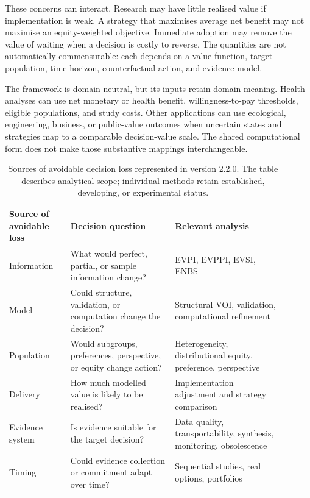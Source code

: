 These concerns can interact. Research may have little realised value if
implementation is weak. A strategy that maximises average net benefit may not
maximise an equity-weighted objective. Immediate adoption may remove the value
of waiting when a decision is costly to reverse. The quantities are not
automatically commensurable: each depends on a value function, target
population, time horizon, counterfactual action, and evidence model.

The framework is domain-neutral, but its inputs retain domain meaning. Health
analyses can use net monetary or health benefit, willingness-to-pay thresholds,
eligible populations, and study costs. Other applications can use ecological,
engineering, business, or public-value outcomes when uncertain states and
strategies map to a comparable decision-value scale. The shared computational
form does not make those substantive mappings interchangeable.

\begin{table}[!ht]
\centering
\footnotesize
\begin{tabular}{p{0.20\linewidth}p{0.34\linewidth}p{0.36\linewidth}}
\toprule
Source of avoidable loss & Decision question & Relevant analysis \\
\midrule
Information & What would perfect, partial, or sample information change? & EVPI, EVPPI, EVSI, ENBS \\
Model & Could structure, validation, or computation change the decision? & Structural VOI, validation, computational refinement \\
Population & Would subgroups, preferences, perspective, or equity change action? & Heterogeneity, distributional equity, preference, perspective \\
Delivery & How much modelled value is likely to be realised? & Implementation adjustment and strategy comparison \\
Evidence system & Is evidence suitable for the target decision? & Data quality, transportability, synthesis, monitoring, obsolescence \\
Timing & Could evidence collection or commitment adapt over time? & Sequential studies, real options, portfolios \\
\bottomrule
\end{tabular}
\caption{Sources of avoidable decision loss represented in version 2.2.0. The
table describes analytical scope; individual methods retain established,
developing, or experimental status.}\label{tab:problems}
\end{table}
\FloatBarrier{}
